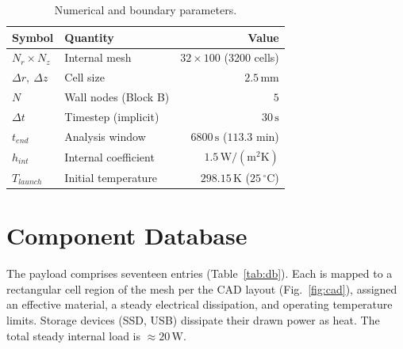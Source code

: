 \documentclass[11pt,a4paper]{article}
\newcommand{\degC}{\,^{\circ}\mathrm{C}}
\newcommand{\unit}[1]{\,\mathrm{#1}}
\begin{document}
\begin{table}[H]
\centering
\caption{Numerical and boundary parameters.}
\label{tab:num}
\begin{tabular}{llr}
\toprule
Symbol & Quantity & Value \\
\midrule
$N_r \times N_z$ & Internal mesh           & $32 \times 100$ (3200 cells) \\
$\Delta r,\ \Delta z$ & Cell size          & $2.5\unit{mm}$ \\
$N$ & Wall nodes (Block B)                 & $5$ \\
$\Delta t$ & Timestep (implicit)           & $30\unit{s}$ \\
$t_{end}$ & Analysis window               & $6800\unit{s}$ ($113.3$ min) \\
$h_{int}$ & Internal coefficient          & $1.5\unit{W/(m^2 K)}$ \\
$T_{launch}$ & Initial temperature        & $298.15\unit{K}$ ($25\degC$) \\
\bottomrule
\end{tabular}
\end{table}

\section{Component Database}
The payload comprises seventeen entries (Table~\ref{tab:db}). Each is mapped to a
rectangular cell region of the mesh per the CAD layout (Fig.~\ref{fig:cad}), assigned an
effective material, a steady electrical dissipation, and operating temperature limits.
Storage devices (SSD, USB) dissipate their drawn power as heat. The total steady internal
load is $\approx 20\unit{W}$.
\end{document}
